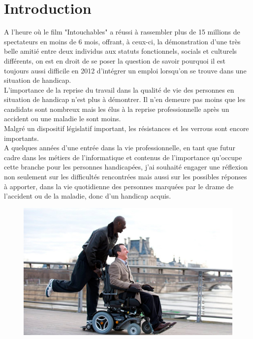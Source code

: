 \chapter{Introduction}

A l'heure où le film "Intouchables" a réussi à rassembler plus de 15 millions de spectateurs en moins de 6 mois, offrant, à ceux-ci, la démonstration d'une très belle amitié entre deux individus aux statuts fonctionnels, socials et culturels différents, on est en droit de se poser la question de savoir pourquoi il est toujours aussi difficile en 2012 d'intégrer un emploi lorsqu'on se trouve dans une situation de handicap.\\

L'importance de la reprise du travail dans la qualité de vie des personnes en situation de handicap n'est plus à démontrer. Il n'en demeure pas moins que les candidats sont nombreux mais les élus à la reprise professionnelle après un accident ou une maladie le sont moins. \\

Malgré un dispositif législatif important, les résistances et les verrous sont encore importants. \\

A quelques années d'une entrée dans la vie professionnelle, en tant que futur cadre dans les métiers de l'informatique et contenus de l'importance qu'occupe cette branche pour les personnes handicapées, j'ai souhaité engager une réflexion non seulement sur les difficultés rencontrées mais aussi sur les possibles réponses à apporter, dans la vie quotidienne des personnes marquées par le drame de l'accident ou de la maladie, donc d'un handicap acquis.


\begin{figure}
\includegraphics[scale=0.5]{figures/intouchable.jpg}
\centering
\end{figure}